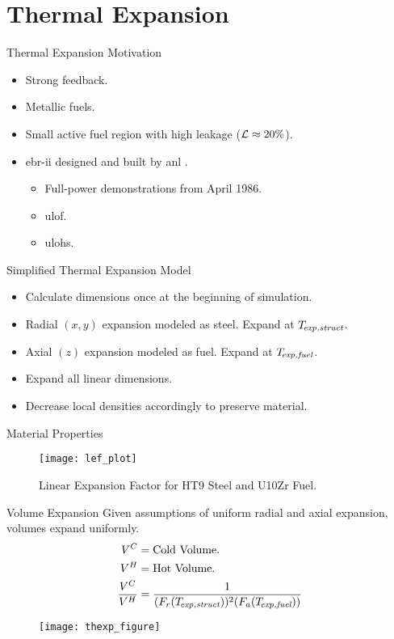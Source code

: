 \section{Thermal Expansion}
\label{sec:thermalExpansion}

\begin{frame}{Thermal Expansion Motivation}
  \begin{itemize}
    \item Strong feedback.
    \item Metallic fuels.
    \item Small active fuel region with high leakage ($\mathcal{L} \approx 20\%$).
    \item \gls{ebr-ii} designed and built by \gls{anl} \cite{PlentifulEnergy}.
      \begin{itemize}
        \item Full-power demonstrations from April 1986.
        \item \gls{ulof}.
        \item \gls{ulohs}.
      \end{itemize}
  \end{itemize}
\end{frame}

\begin{frame}{Simplified Thermal Expansion Model}
  \begin{itemize}
    \item Calculate dimensions once at the beginning of simulation.
    \item Radial $(x,y)$ expansion modeled as steel. Expand at $T_{\!\mbox{\scriptsize \em exp,struct}}$.
    \item Axial $(z)$ expansion modeled as fuel. Expand at ${T_{\!\mbox{\scriptsize \em exp,fuel}}}$.
    \item Expand all linear dimensions.
    \item Decrease local densities accordingly to preserve material.
  \end{itemize}
\end{frame}

\begin{frame}{Material Properties}
  \begin{figure}
    \centering
    \texttt{[image: lef\_plot]}
    \caption{Linear Expansion Factor for HT9 Steel and U10Zr Fuel.}
    \label{fig:lef_plot}
  \end{figure}
\end{frame}

\begin{frame}{Volume Expansion}
  Given assumptions of uniform radial and axial expansion, volumes expand
  uniformly.
  \begin{align}
    \label{eq:volume_ratio}
    V^C &= \text{Cold Volume.}\\
    V^H &= \text{Hot Volume.}\\
    \frac{V^C}{V^H} &= \frac{1}{(F_r(T_{\!\mbox{\scriptsize \em exp,struct}}))^2 (F_a({T_{\!\mbox{\scriptsize \em exp,fuel}}}))}
  \end{align}

  \begin{figure}
    \centering
    \texttt{[image: thexp\_figure]}
    \label{fig:thexp_figure}
  \end{figure}
\end{frame}


